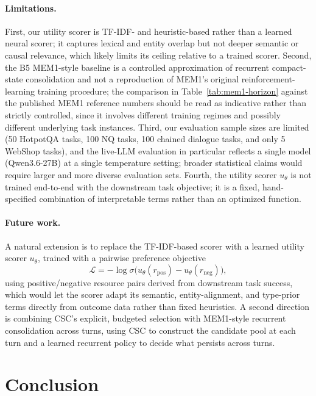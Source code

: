 \documentclass{article}
\begin{document}
\paragraph{Limitations.} First, our utility scorer is TF-IDF- and heuristic-based rather than a learned neural scorer; it captures lexical and entity overlap but not deeper semantic or causal relevance, which likely limits its ceiling relative to a trained scorer. Second, the B5 MEM1-style baseline is a controlled approximation of recurrent compact-state consolidation and not a reproduction of MEM1's original reinforcement-learning training procedure; the comparison in Table~\ref{tab:mem1-horizon} against the published MEM1 reference numbers should be read as indicative rather than strictly controlled, since it involves different training regimes and possibly different underlying task instances. Third, our evaluation sample sizes are limited (50 HotpotQA tasks, 100 NQ tasks, 100 chained dialogue tasks, and only 5 WebShop tasks), and the live-LLM evaluation in particular reflects a single model (Qwen3.6-27B) at a single temperature setting; broader statistical claims would require larger and more diverse evaluation sets. Fourth, the utility scorer $u_\theta$ is not trained end-to-end with the downstream task objective; it is a fixed, hand-specified combination of interpretable terms rather than an optimized function.

\paragraph{Future work.} A natural extension is to replace the TF-IDF-based scorer with a learned utility scorer $u_\theta$, trained with a pairwise preference objective
\[
\mathcal{L} = -\log \sigma\big(u_\theta(r_{\text{pos}}) - u_\theta(r_{\text{neg}})\big),
\]
using positive/negative resource pairs derived from downstream task success, which would let the scorer adapt its semantic, entity-alignment, and type-prior terms directly from outcome data rather than fixed heuristics. A second direction is combining CSC's explicit, budgeted selection with MEM1-style recurrent consolidation across turns, using CSC to construct the candidate pool at each turn and a learned recurrent policy to decide what persists across turns.

\section{Conclusion}
\label{sec:conclusion}
\end{document}
